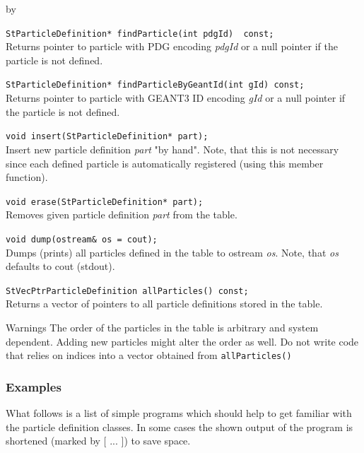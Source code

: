 \documentclass[twoside]{article}
\newcommand{\comp}[1]{\texttt{#1}}%
\newcommand{\args}[1]{\textit{#1}}%
\newcommand{\entrylabel}[1]{\mbox{\textbf{{#1}}}\hfil}%
\newenvironment{entry}
{\begin{list}{}%
    {\renewcommand{\makelabel}{\entrylabel}%
     \setlength{\labelwidth}{90pt}%
     \setlength{\leftmargin}{\labelwidth}
     \advance\leftmargin by \labelsep%
      }%
    }%
  {\end{list}}
\newcommand{\Entrylabel}[1]%
{\raisebox{0pt}[1ex][0pt]{\makebox[\labelwidth][l]%
    {\parbox[t]{\labelwidth}{\hspace{0pt}\textbf{{#1}}}}}}
\newenvironment{Entry}%
{\renewcommand{\entrylabel}{\Entrylabel}\begin{entry}}%
  {\end{entry}}
\begin{document}
\begin{Entry}
    \verb+StParticleDefinition* findParticle(int pdgId)  const; +\\          
    Returns pointer to particle with PDG encoding \args{pdgId} or a null
    pointer if the particle is not defined.
    
    \verb+StParticleDefinition* findParticleByGeantId(int gId) const;+\\   
    Returns pointer to particle with GEANT3 ID encoding \args{gId} or a null
    pointer if the particle is not defined.
    
    \verb+void insert(StParticleDefinition* part);+\\
    Insert new particle definition \args{part} "by hand".
    Note, that this is not necessary
    since each defined particle is automatically registered
    (using this member function).
    
    \verb+void erase(StParticleDefinition* part);+\\
    Removes given particle definition \args{part} from the table.
    
    \verb+void dump(ostream& os = cout);+\\ 
    Dumps (prints) all particles defined in the table to ostream 
    \args{os}. Note, that \args{os} defaults to cout (stdout).
    
    \verb+StVecPtrParticleDefinition allParticles() const;+\\
    Returns a vector of pointers to all particle definitions stored
    in the table.

\item[Warnings]
    The order of the particles in the table is arbitrary and
    system dependent. Adding new particles might alter
    the order as well. Do not write code that relies on indices
    into a vector obtained from \comp{allParticles()}
\end{Entry}

\subsubsection{Examples}
\label{sec:pex}
What follows is a list of simple programs which should help to get familiar
with the particle definition classes. In some cases the shown
output of the program is shortened (marked by [ ... ]) to save space.
\end{document}
